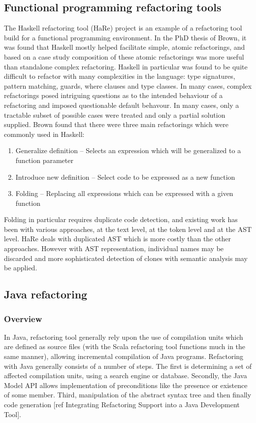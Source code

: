 \subsection{Functional programming refactoring tools}
The Haskell refactoring tool (HaRe) project is an example of a refactoring tool build for a functional programming environment. In the PhD thesis of Brown, it was found that Haskell mostly helped facilitate simple, atomic refactorings, and based on a case study composition of these atomic refactorings was more useful than standalone complex refactoring. Haskell in particular was found to be quite difficult to refactor with many complexities in the language: type signatures, pattern matching, guards, where clauses and type classes. In many cases, complex refactorings posed intriguing questions as to the intended behaviour of a refactoring and imposed questionable default behavour. In many cases, only a tractable subset of possible cases were treated and only a partial solution supplied. Brown found that there were three main refactorings which were commonly used in Haskell: 

\begin{enumerate}
\item Generalize definition -- Selects an expression which will be generalized to a function parameter
\item Introduce new definition -- Select code to be expressed as a new function
\item Folding -- Replacing all expressions which can be expressed with a given function
\end{enumerate}

Folding in particular requires duplicate code detection, and existing work has been with various approaches, at the text level, at the token level and at the AST level. HaRe deals with duplicated AST which is more costly than the other approaches. However with AST representation, individual names may be discarded and more sophisticated detection of clones with semantic analysis may be applied. 

\subsection{Java refactoring}
\subsubsection{Overview}
In Java, refactoring tool generally rely upon the use of compilation units which are defined as source files (with the Scala refactoring tool functions much in the same manner), allowing incremental compilation of Java programs. Refactoring with Java generally consists of  a number of steps. The first is determining a set of affected compilation units, using a search engine or database. Secondly, the Java Model API allows implementation of preconditions like the presence or existence of some member. Third, manipulation of the abstract syntax tree and then finally code generation [ref Integrating Refactoring Support into a Java Development Tool]. 

